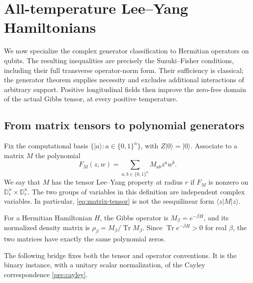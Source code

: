 \documentclass[reqno]{amsart}
\theoremstyle{definition}
\theoremstyle{remark}
\newcommand{\D}{\mathbb D}
\DeclareMathOperator{\Tr}{Tr}
\begin{document}
\section{All-temperature Lee--Yang Hamiltonians}\label{eq:section}

We now specialize the complex generator classification to Hermitian
operators on qubits.  The resulting inequalities are precisely the
Suzuki--Fisher conditions, including their full transverse operator-norm
form.  Their sufficiency is classical; the generator theorem supplies
necessity and excludes additional interactions of arbitrary support.
Positive longitudinal fields then improve the zero-free domain of the
actual Gibbs tensor, at every positive temperature.

\subsection{From matrix tensors to polynomial generators}

Fix the computational basis \(\{|a\rangle:a\in\{0,1\}^n\}\),
with \(Z|0\rangle=|0\rangle\).  Associate to a matrix \(M\) the
polynomial
\begin{equation}\label{eq:matrix-tensor}
 F_M(z,w)=\sum_{a,b\in\{0,1\}^n}M_{ab}z^aw^b.
\end{equation}
We say that \(M\) has the tensor Lee--Yang property at radius \(r\)
if \(F_M\) is nonzero on \(\D_r^n\times\D_r^n\).  The two
groups of variables in this definition are independent complex variables.
In particular, \eqref{eq:matrix-tensor} is not the sesquilinear form
\(\langle z|M|z\rangle\).

For a Hermitian Hamiltonian \(H\), the Gibbs operator is
\(M_\beta=e^{-\beta H}\), and its normalized density matrix is
\(\rho_\beta=M_\beta/\Tr M_\beta\).  Since
\(\Tr e^{-\beta H}>0\) for real \(\beta\), the two matrices have
exactly the same polynomial zeros.

The following bridge fixes both the tensor and operator conventions.
It is the binary instance, with a unitary scalar normalization, of the
Cayley correspondence \eqref{pre:cayley}.
\end{document}
